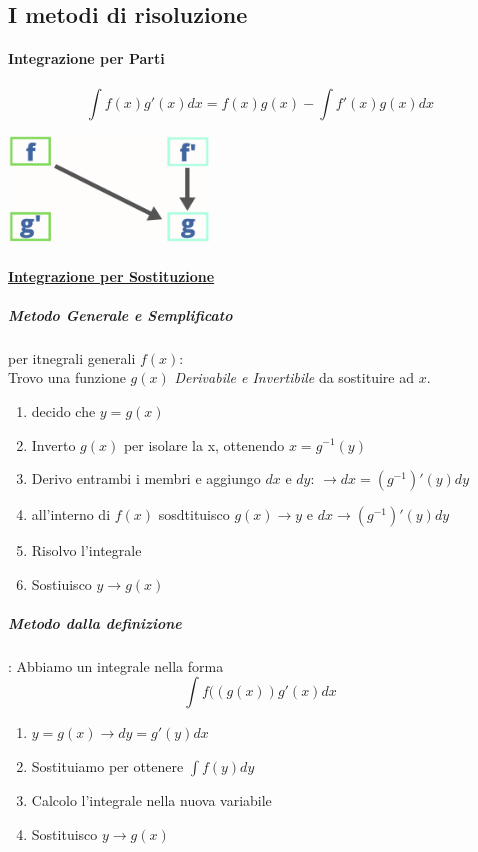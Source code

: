 \documentclass[12pt, a4paper]{article}
\begin{document}
\subsection*{I metodi di risoluzione}
\paragraph*{Integrazione per Parti}
$$\int f(x)g'(x)dx = f(x)g(x)-\int f'(x)g(x)dx$$
\begin{center}
	\includegraphics[width=0.4\textwidth]{integrazione-per-parti.png}
\end{center}

\paragraph*{\underline{Integrazione per Sostituzione}} 
\subparagraph*{\emph{Metodo Generale e Semplificato}} per itnegrali generali $f(x)$:
\\Trovo una funzione $g(x)$ \emph{Derivabile e Invertibile} da sostituire ad $x$.
\begin{enumerate}
	\item decido che $y=g(x)$
	\item Inverto $g(x)$ per isolare la x, ottenendo $x=g^{-1}(y)$
	\item Derivo entrambi i membri e aggiungo $dx$ e $dy$: $\to dx=(g^{-1})'(y)dy$
	\item all'interno di $f(x)$ sosdtituisco $g(x) \to y$ e $dx \to (g^{-1})'(y)dy$
	\item Risolvo l'integrale
	\item Sostiuisco $y \to g(x)$ 
\end{enumerate}
\subparagraph*{Metodo dalla definizione}: Abbiamo un integrale nella forma
$$\int f((g(x))g'(x) dx$$
\begin{enumerate}
	\item $y=g(x)\to dy=g'(y)dx$
	\item Sostituiamo per ottenere $\int f(y)dy$
	\item Calcolo l'integrale nella nuova variabile
	\item Sostituisco $y\to g(x)$
\end{enumerate}
\end{document}
